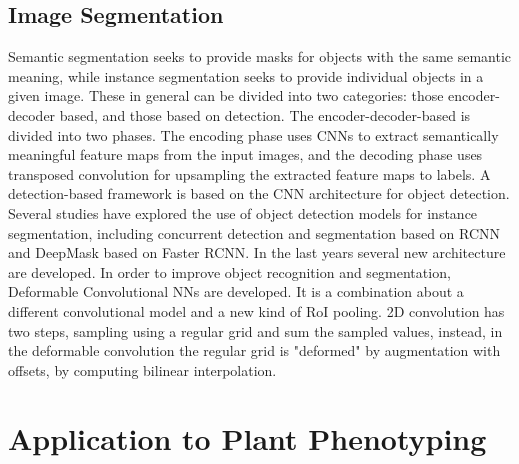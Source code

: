 \subsection{Image Segmentation}
Semantic segmentation seeks to provide masks for objects with the same semantic meaning, while instance segmentation seeks to provide individual objects in a given image.
These in general can be divided into two categories: those encoder-decoder based, and those based on detection. The encoder-decoder-based is divided into two phases.
The encoding phase uses CNNs to extract semantically meaningful feature maps from the input images, and the decoding phase uses transposed convolution for upsampling
the extracted feature maps to labels. A detection-based framework is based on the CNN architecture for object detection. Several studies have explored the use of
object detection models for instance segmentation, including concurrent detection and segmentation based on RCNN and DeepMask based on Faster RCNN\cite{ren2015faster}.
In the last years several new architecture are developed. In order to improve object recognition and segmentation, Deformable Convolutional NNs \cite{dai2017deformable} are developed.
It is a combination about a different convolutional model and a new kind of RoI pooling. 2D convolution has two steps, sampling using a regular grid and sum the sampled
values, instead, in the deformable convolution the regular grid is "deformed" by augmentation with offsets, by computing bilinear interpolation.






\section{Application to Plant Phenotyping}
